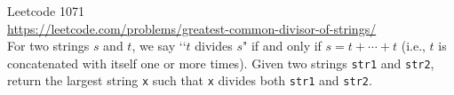   Leetcode 1071 \\
  \url{https://leetcode.com/problems/greatest-common-divisor-of-strings/} \\
  For two strings $s$ and $t$, we say
  \lq\lq $t$ divides $s$" if and only if $s = t + \cdots + t$
  (i.e., $t$ is concatenated with itself one or more times).
  Given two strings \verb!str1! and \verb!str2!, return the largest string
  \verb!x! such that \verb!x! divides both \verb!str1! and \verb!str2!.
